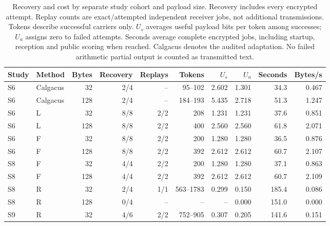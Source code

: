 \begin{table}[t]
\caption{Recovery and cost by separate study cohort and payload size. Recovery includes every encrypted attempt. Replay counts are exact/attempted independent receiver jobs, not additional transmissions. Tokens describe successful carriers only. $U_s$ averages useful payload bits per token among successes; $U_a$ assigns zero to failed attempts. Seconds average complete encrypted jobs, including startup, reception and public scoring when reached. Calgacus denotes the audited adaptation. No failed arithmetic partial output is counted as transmitted text.}
\label{tab:recovery}
\centering\small
\begin{tabular}{llrrrrrrrr}
\hline
Study & Method & Bytes & Recovery & Replays & Tokens & $U_s$ & $U_a$ & Seconds & Bytes/s\\
\hline
S6 & Calgacus & 32 & 2/4 & -- & 95--102 & 2.602 & 1.301 & 34.3 & 0.467 \\
S6 & Calgacus & 128 & 2/4 & -- & 184--193 & 5.435 & 2.718 & 51.3 & 1.247 \\
S6 & L & 32 & 8/8 & 2/2 & 208 & 1.231 & 1.231 & 37.6 & 0.851 \\
S6 & L & 128 & 8/8 & 2/2 & 400 & 2.560 & 2.560 & 61.8 & 2.071 \\
S6 & F & 32 & 8/8 & 2/2 & 200 & 1.280 & 1.280 & 36.5 & 0.876 \\
S6 & F & 128 & 8/8 & 2/2 & 392 & 2.612 & 2.612 & 60.7 & 2.107 \\
S8 & F & 32 & 4/4 & 2/2 & 200 & 1.280 & 1.280 & 37.1 & 0.863 \\
S8 & F & 128 & 4/4 & 2/2 & 392 & 2.612 & 2.612 & 60.7 & 2.109 \\
S8 & R & 32 & 2/4 & 1/1 & 563--1783 & 0.299 & 0.150 & 185.4 & 0.086 \\
S8 & R & 128 & 0/4 & -- & -- & -- & 0.000 & 151.0 & 0.000 \\
S9 & R & 32 & 4/6 & 2/2 & 752--905 & 0.307 & 0.205 & 141.6 & 0.151 \\
\hline
\end{tabular}
\end{table}
